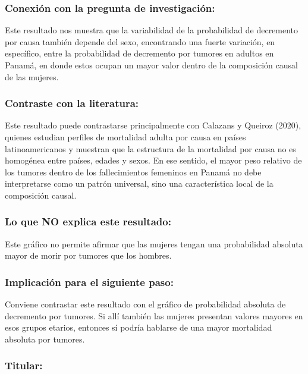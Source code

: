 \documentclass[
  spanish,
  letterpaper,
  DIV=11,
  numbers=noendperiod]{scrartcl}
\begin{document}
\subsubsection{Conexión con la pregunta de
investigación:}\label{conexiuxf3n-con-la-pregunta-de-investigaciuxf3n}

Este resultado nos muestra que la variabilidad de la probabilidad de
decremento por causa también depende del sexo, encontrando una fuerte
variación, en específico, entre la probabilidad de decremento por
tumores en adultos en Panamá, en donde estos ocupan un mayor valor
dentro de la composición causal de las mujeres.

\subsubsection{Contraste con la
literatura:}\label{contraste-con-la-literatura-2}

Este resultado puede contrastarse principalmente con Calazans y Queiroz
(2020), quienes estudian perfiles de mortalidad adulta por causa en
países latinoamericanos y muestran que la estructura de la mortalidad
por causa no es homogénea entre países, edades y sexos. En ese sentido,
el mayor peso relativo de los tumores dentro de los fallecimientos
femeninos en Panamá no debe interpretarse como un patrón universal, sino
una característica local de la composición causal.

\subsubsection{Lo que NO explica este
resultado:}\label{lo-que-no-explica-este-resultado-2}

Este gráfico no permite afirmar que las mujeres tengan una probabilidad
absoluta mayor de morir por tumores que los hombres.

\subsubsection{Implicación para el siguiente
paso:}\label{implicaciuxf3n-para-el-siguiente-paso-2}

Conviene contrastar este resultado con el gráfico de probabilidad
absoluta de decremento por tumores. Si allí también las mujeres
presentan valores mayores en esos grupos etarios, entonces sí podría
hablarse de una mayor mortalidad absoluta por tumores.

\subsubsection{Titular:}\label{titular-3}
\end{document}
